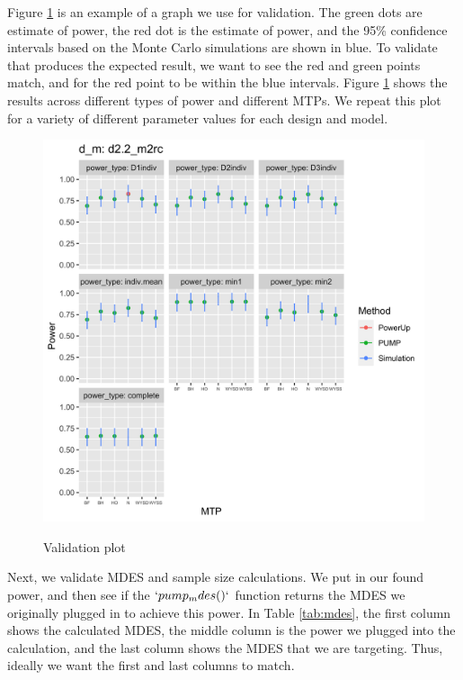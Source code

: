 \documentclass[
]{jss}
\begin{document}
Figure \ref{fig:validate} is an example of a graph we use for
validation. The green dots are  estimate of power, the red dot
is the  estimate of power, and the 95\% confidence
intervals based on the Monte Carlo simulations are shown in blue. To
validate that  produces the expected result, we want to see
the red and green points match, and for the red point to be within the
blue intervals. Figure \ref{fig:validate} shows the results across
different types of power and different MTPs. We repeat this plot for a
variety of different parameter values for each design and model.

\begin{figure}[h!]
\centering
  \includegraphics[width=6in]{example_validation_plot.png}
  \label{fig:validate}
  \caption{Validation plot}
\end{figure}

Next, we validate MDES and sample size calculations. We put in our found
power, and then see if the \(`pump_mdes()`\) function returns the MDES
we originally plugged in to achieve this power. In Table \ref{tab:mdes},
the first column shows the calculated MDES, the middle column is the
power we plugged into the calculation, and the last column shows the
MDES that we are targeting. Thus, ideally we want the first and last
columns to match.
\end{document}

